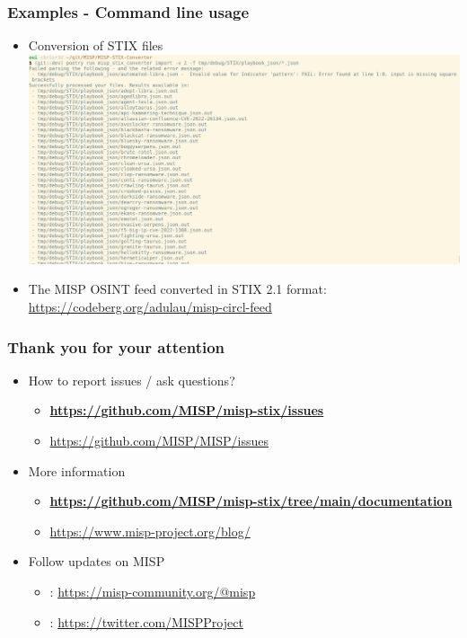 \begin{frame}
    \frametitle{Examples - Command line usage}
    \begin{itemize}
        \item Conversion of STIX files
        \includegraphics[scale=0.13]{images/stix_import_results.png}
        \item The MISP OSINT feed converted in STIX 2.1 format: \url{https://codeberg.org/adulau/misp-circl-feed}
    \end{itemize}
\end{frame}

\begin{frame}
    \frametitle{Thank you for your attention}
    \begin{itemize}
        \item How to report issues / ask questions?
        \begin{itemize}
            \item {\bf\url{https://github.com/MISP/misp-stix/issues}}
            \item {\url{https://github.com/MISP/MISP/issues}}
        \end{itemize}
        \item More information
        \begin{itemize}
            \item {\bf\url{https://github.com/MISP/misp-stix/tree/main/documentation}}
            \item \url{https://www.misp-project.org/blog/}
        \end{itemize}
        \item Follow updates on MISP
        \begin{itemize}
            \item \faMastodon : \url{https://misp-community.org/@misp}
            \item \faTwitter : \url{https://twitter.com/MISPProject}
        \end{itemize}
    \end{itemize}
\end{frame}
